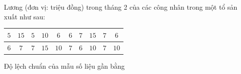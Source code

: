 \begin{ex}
Lương (đơn vị: triệu đồng) trong tháng 2 của các công nhân trong một tổ sản xuất như sau:
\begin{center}
\begin{tabular}{|c|c|c|c|c|c|c|c|c|c|}\hline
$5$ & $15$ & $5$ & $10$ & $6$ & $6$ & $7$ & $15$ & $7$ & $6$\\\hline
$6$ & $7$ & $7$ & $15$ & $10$ & $7$ & $6$ & $10$ & $7$ & $10$\\\hline
\end{tabular}
\end{center}
Độ lệch chuẩn của mẫu số liệu gần bằng
\end{ex}
